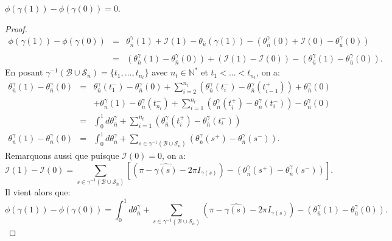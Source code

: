 \begin{lemma}
    \label{lem:marvelous_lemma}
    $\phi(\gamma(1))-\phi(\gamma(0))=0$.
\end{lemma}
\begin{proof}
    $$
    \begin{array}{lcl}
        \phi(\gamma(1))-\phi(\gamma(0))&=&\theta^\gamma_{\bar{n}}(1)+\mathcal{I}(1)-\theta_{\bar{u}}(\gamma(1))-(\theta^\gamma_{\bar{n}}(0)+\mathcal{I}(0)-\theta_{\bar{u}}^\gamma(0))\\\\
        &=&(\theta^\gamma_{\bar{n}}(1)-\theta_{\bar{n}}^\gamma(0))+(\mathcal{I}(1)-\mathcal{I}(0))-(\theta_{\bar{u}}^\gamma(1)-\theta_{\bar{u}}^\gamma(0)).
    \end{array}
    $$
    En posant $\gamma^{-1}(\mathcal{B}\cup\mathcal{S}_{\bar{n}})=\{t_1,\dots,t_{n_t}\}$ avec $n_t\in\mathbb{N}^*$ et $t_1<\dots<t_{n_t}$, on a:
    $$
    \begin{array}{lcl}
        \theta_{\bar{n}}^\gamma(1)-\theta^\gamma_{\bar{n}}(0)&=&\theta_{\bar{n}}^\gamma(t_1^-)-\theta_{\bar{n}}^\gamma(0)+\displaystyle\sum_{i=2}^{n_t}\left(\theta_{\bar{n}}^\gamma(t_i^-)-\theta_{\bar{n}}^\gamma(t_{i-1}^+)\right)+\theta_{\bar{n}}^\gamma(0)\\[0.7cm]
        &&+\theta_{\bar{n}}^\gamma(1)-\theta_{\bar{n}}^\gamma(t_{n_t}^-)+\displaystyle\sum_{i=1}^{n_t}\left(\theta_{\bar{n}}^\gamma(t_i^+)-\theta_{\bar{n}}^\gamma(t_i^-)\right)-\theta_{\bar{n}}^\gamma(0)\\[0.7cm]
        &=&\displaystyle\int_0^1d\theta_{\bar{n}}^\gamma+\displaystyle\sum_{i=1}^{n_t}\left(\theta_{\bar{n}}^\gamma(t_i^+)-\theta_{\bar{n}}^\gamma(t_i^-)\right)\\[0.7cm]
        \theta_{\bar{n}}^\gamma(1)-\theta^\gamma_{\bar{n}}(0)&=&\displaystyle\int_0^1d\theta_{\bar{n}}^\gamma+\displaystyle\sum_{s\in\gamma^{-1}(\mathcal{B}\cup\mathcal{S}_{\bar{n}})}\left(\theta_{\bar{n}}^\gamma(s^+)-\theta_{\bar{n}}^\gamma(s^-)\right).
    \end{array}
    $$
    Remarquons aussi que puisque $\mathcal{I}(0)=0$, on a:
    $$
    \mathcal{I}(1)-\mathcal{I}(0)=\sum_{s\in\gamma^{-1}(\mathcal{B}\cup\mathcal{S}_{\bar{n}})}\left[\left(\pi-\widehat{\gamma(s)}-2\pi I_{\gamma(s)}\right)-\left(\theta^{\gamma}_{\bar{n}}(s^+)-\theta^{\gamma}_{\bar{n}}(s^-)\right)\right].
    $$
    Il vient alors que:
    $$
    \phi(\gamma(1))-\phi(\gamma(0))=\displaystyle\int_0^1d\theta_{\bar{n}}^\gamma+\sum_{s\in\gamma^{-1}(\mathcal{B}\cup\mathcal{S}_{\bar{n}})}\left(\pi-\widehat{\gamma(s)}-2\pi I_{\gamma(s)}\right)-(\theta_{\bar{u}}^\gamma(1)-\theta_{\bar{u}}^\gamma(0)).
$$
\end{proof}
